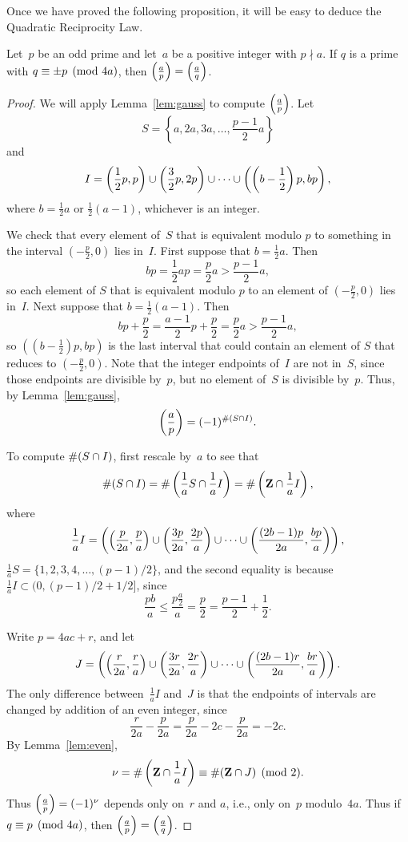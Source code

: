 Once we have proved the following
proposition, it will be easy to deduce the Quadratic Reciprocity Law.
\begin{proposition}[Euler]\label{prop:euler_prop}
Let~$p$ be an odd prime and let~$a$ be a positive integer with $p\nmid a$.
If $q$ is a prime with $q\equiv \pm p\pmod{4a}$, then
$\left(\frac{a}{p}\right) = \left(\frac{a}{q}\right)$.
\end{proposition}
\begin{proof}
We will apply Lemma~\ref{lem:gauss} to compute $\left(\frac{a}{p}\right)$.  Let
$$
S = \left\{a, 2a, 3a, \ldots, \frac{p-1}{2}a\right\}
$$
and
$$
I = \left(\frac{1}{2}p,p\right) \cup \left(\frac{3}{2}p, 2p\right)
  \cup \cdots \cup \left(\left(b-\frac{1}{2}\right)p,bp\right),
$$
where $b=\frac{1}{2}a$ or $\frac{1}{2}(a-1)$, whichever is an integer.

We check that every element of~$S$ that is equivalent modulo $p$ to something in the
interval $(-\frac{p}{2},0)$ lies in~$I$.
First suppose that $b=\frac{1}{2}a$.  Then
$$bp = \frac{1}{2}a p = \frac{p}{2} a > \frac{p-1}{2} a,$$ so each
element of $S$ that is equivalent modulo $p$ to an
element of $(-\frac{p}{2},0)$ lies in~$I$.
Next suppose that $b=\frac{1}{2}(a-1)$.  Then
$$
  bp+\frac{p}{2} = \frac{a-1}{2}p + \frac{p}{2} = \frac{p}{2}a> \frac{p-1}{2}a,
$$ so $((b-\frac{1}{2})p,bp)$ is the
last interval that could contain an element of $S$ that reduces to
$(-\frac{p}{2},0)$.  Note that the integer endpoints of~$I$ are not
in~$S$, since those endpoints are divisible by~$p$, but no element
of~$S$ is divisible by~$p$.  Thus, by Lemma~\ref{lem:gauss},
$$\left(\frac{a}{p}\right) = (-1)^{\# (S\cap I)}.$$

To compute $\#(S\cap I)$, first rescale by~$a$ to see that
$$
\#(S\cap I) = \#\left(\frac{1}{a} S \cap \frac{1}{a}I\right)
 = \#\left(\mathbf{Z} \cap \frac{1}{a}I\right),
$$
where
$$\frac{1}{a} I = \left(\left(\frac{p}{2a},\frac{p}{a}\right) \cup \left(\frac{3p}{2a},\frac{2p}{a}\right) \cup \cdots \cup \left(\frac{(2b-1)p}{2a},\frac{bp}{a}\right) \right),$$
$\frac{1}{a}S = \{1,2,3,4,\ldots,(p-1)/2\}$, and
the second equality is because $\frac{1}{a} I \subset (0,(p-1)/2 + 1/2]$,
since $$\frac{pb}{a} \leq \frac{p \frac{a}{2}}{a} = \frac{p}{2} =
\frac{p-1}{2}+\frac{1}{2}.$$

Write $p=4ac+r$, and let
$$
J = \left(\left(\frac{r}{2a},\frac{r}{a}\right) \cup \left(\frac{3r}{2a},\frac{2r}{a}\right) \cup \cdots \cup \left(\frac{(2b-1)r}{2a},\frac{br}{a}\right) \right).
$$
The only difference between~$\frac{1}{a}I$ and~$J$ is that the endpoints of
intervals are changed by addition of an even integer,
since
$$
\frac{r}{2a} - \frac{p}{2a} = \frac{p}{2a} - 2c - \frac{p}{2a} = -2c.
$$
  By
Lemma~\ref{lem:even},
$$
  \nu=\#\left(\mathbf{Z} \cap \frac{1}{a}I\right) \equiv \#(\mathbf{Z}\cap J)\pmod{2}.
$$
Thus $\left(\frac{a}{p}\right)=(-1)^\nu$ depends only on~$r$ and $a$, i.e., only
on~$p$ modulo~$4a$.  Thus if $q\equiv p\pmod{4a}$, then
$\left(\frac{a}{p}\right)=\left(\frac{a}{q}\right)$.


\end{proof}
